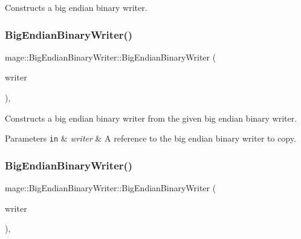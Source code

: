 Constructs a big endian binary writer. \hypertarget{classmage_1_1_big_endian_binary_writer_aafe65752342b2740e7293878ae469d9f}{}\label{classmage_1_1_big_endian_binary_writer_aafe65752342b2740e7293878ae469d9f} 
\subsubsection{\texorpdfstring{Big\+Endian\+Binary\+Writer()}{BigEndianBinaryWriter()}\hspace{0.1cm}{\footnotesize\ttfamily [2/3]}}
{\footnotesize\ttfamily mage\+::\+Big\+Endian\+Binary\+Writer\+::\+Big\+Endian\+Binary\+Writer (\begin{DoxyParamCaption}\item[{const \hyperlink{classmage_1_1_big_endian_binary_writer}{Big\+Endian\+Binary\+Writer} \&}]{writer }\end{DoxyParamCaption})\hspace{0.3cm}{\ttfamily [protected]}, {\ttfamily [delete]}}

Constructs a big endian binary writer from the given big endian binary writer.


\begin{DoxyParams}[1]{Parameters}
\mbox{\tt in}  & {\em writer} & A reference to the big endian binary writer to copy. \\
\hline
\end{DoxyParams}
\hypertarget{classmage_1_1_big_endian_binary_writer_a9b20aeebc41030d173cb44067665adb0}{}\label{classmage_1_1_big_endian_binary_writer_a9b20aeebc41030d173cb44067665adb0} 
\subsubsection{\texorpdfstring{Big\+Endian\+Binary\+Writer()}{BigEndianBinaryWriter()}\hspace{0.1cm}{\footnotesize\ttfamily [3/3]}}
{\footnotesize\ttfamily mage\+::\+Big\+Endian\+Binary\+Writer\+::\+Big\+Endian\+Binary\+Writer (\begin{DoxyParamCaption}\item[{\hyperlink{classmage_1_1_big_endian_binary_writer}{Big\+Endian\+Binary\+Writer} \&\&}]{writer }\end{DoxyParamCaption})\hspace{0.3cm}{\ttfamily [protected]}, {\ttfamily [default]}}

